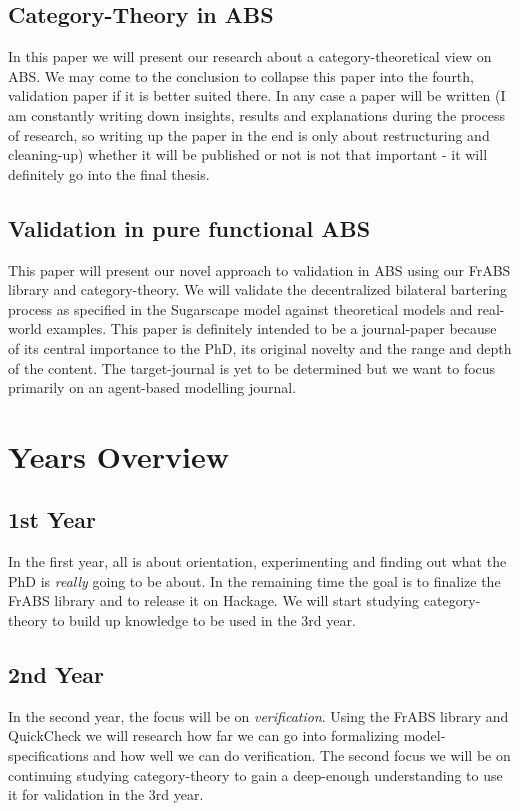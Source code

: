 \subsection{Category-Theory in ABS}
In this paper we will present our research about a category-theoretical view on ABS. 
We may come to the conclusion to collapse this paper into the fourth, validation paper if it is better suited there. In any case a paper will be written (I am constantly writing down insights, results and explanations during the process of research, so writing up the paper in the end is only about restructuring and cleaning-up) whether it will be published or not is not that important - it will definitely go into the final thesis.

\subsection{Validation in pure functional ABS}
This paper will present our novel approach to validation in ABS using our FrABS library and category-theory. We will validate the decentralized bilateral bartering process as specified in the Sugarscape model against theoretical models and real-world examples. This paper is definitely intended to be a journal-paper because of its central importance to the PhD, its original novelty and the range and depth of the content. The target-journal is yet to be determined but we want to focus primarily on an agent-based modelling journal.

\section{Years Overview}

\subsection{1st Year}
In the first year, all is about orientation, experimenting and finding out what the PhD is \textit{really} going to be about. In the remaining time the goal is to finalize the FrABS library and to release it on Hackage. We will start studying category-theory to build up knowledge to be used in the 3rd year.

\subsection{2nd Year}
In the second year, the focus will be on \textit{verification}. Using the FrABS library and QuickCheck we will research how far we can go into formalizing model-specifications and how well we can do verification. The second focus we will be on continuing studying category-theory to gain a deep-enough understanding to use it for validation in the 3rd year.

